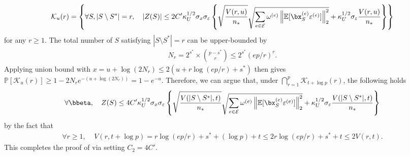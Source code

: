 \documentclass[10pt]{article}
\numberwithin{equation}{section}
\begin{document}
\begin{align*}
\mathcal{K}_u(r) = \left\{ \forall S, |S\setminus S^*|=r, ~~~ |Z(S)| \le 2C'\kappa_U^{1/2} \sigma_x \sigma_\varepsilon \left\{ \sqrt{\frac{V(r,u)}{n_*}} \sqrt{\sum_{e\in \mathcal{E}} \omega^{(e)} \left\|\mathbb{E}[\bx_S^{(e)} \varepsilon^{(e)}]\right\|_2^2} + \kappa_U^{1/2} \sigma_\varepsilon \frac{V(r,u)}{n_*} \right\}\right\}
\end{align*} for any $r\ge 1$. The total number of $S$ satisfying $|S\setminus S^*|=r$ can be upper-bounded by
\begin{align*}
    N_r = 2^{s^*} \times \binom{p-s^*}{r} \le 2^{s^*} (ep/r)^r.
\end{align*} Applying union bound with $x=u+\log(2N_r) \le 2(u + r\log(ep/r) + s^*)$ then gives $\mathbb{P}[\mathcal{K}_u(r)] \ge 1-2N_r e^{-(u+\log(2N_r))} = 1-e^{-u}$. Therefore, we can argue that, under $\bigcap_{r=1}^p \mathcal{K}_{t+\log p}(r)$, the following holds
\begin{align*}
\forall \bbeta, ~~~ Z(S) \le 4C'\kappa_U^{1/2} \sigma_x \sigma_\varepsilon \left\{ \sqrt{\frac{V(|S\setminus S^*|,t)}{n_*}} \sqrt{\sum_{e\in \mathcal{E}} \omega^{(e)} \left\|\mathbb{E}[\bx_S^{(e)} \varepsilon^{(e)}]\right\|_2^2} + \kappa_U^{1/2} \sigma_\varepsilon \frac{V(|S\setminus S^*|,t)}{n_*} \right\}
\end{align*} by the fact that
\begin{align*}
    \forall r \ge 1, ~~~~~ V(r, t + \log p) = r\log(ep/r) + s^* + (\log p) + t \le 2r\log(ep/r) + s^* + t \le 2V(r, t).
\end{align*} This completes the proof of via setting $C_2 = 4C'$.
\end{document}
